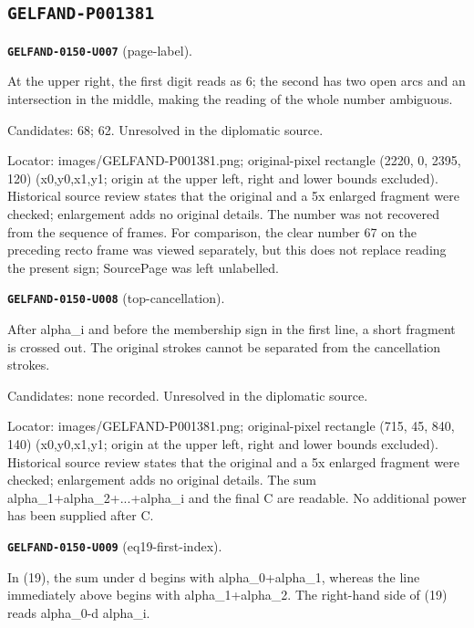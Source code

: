 \documentclass[11pt]{article}
\theoremstyle{definition}
\theoremstyle{remark}
\begin{document}
\subsection*{\texttt{GELFAND-P001381}}
\noindent\leavevmode{}\label{GELFAND-P001381:page-label:note}\textbf{\texttt{GELFAND-0150-U007}} (page-label).\par\nopagebreak[4]
At the upper right, the first digit reads as 6; the second has two open arcs and an intersection in the middle, making the reading of the whole number ambiguous.\par
Candidates: 68; 62. Unresolved in the diplomatic source.\par
Locator: images/GELFAND-P001381.png; original-pixel rectangle (2220, 0, 2395, 120) (x0,y0,x1,y1; origin at the upper left, right and lower bounds excluded). Historical source review states that the original and a 5x enlarged fragment were checked; enlargement adds no original details. The number was not recovered from the sequence of frames. For comparison, the clear number 67 on the preceding recto frame was viewed separately, but this does not replace reading the present sign; SourcePage was left unlabelled.\par\medskip
\noindent\leavevmode{}\label{GELFAND-P001381:top-cancellation:note}\textbf{\texttt{GELFAND-0150-U008}} (top-cancellation).\par\nopagebreak[4]
After alpha\_i and before the membership sign in the first line, a short fragment is crossed out. The original strokes cannot be separated from the cancellation strokes.\par
Candidates: none recorded. Unresolved in the diplomatic source.\par
Locator: images/GELFAND-P001381.png; original-pixel rectangle (715, 45, 840, 140) (x0,y0,x1,y1; origin at the upper left, right and lower bounds excluded). Historical source review states that the original and a 5x enlarged fragment were checked; enlargement adds no original details. The sum alpha\_1+alpha\_2+...+alpha\_i and the final C are readable. No additional power has been supplied after C.\par\medskip
\noindent\leavevmode{}\label{GELFAND-P001381:eq19-first-index:note}\textbf{\texttt{GELFAND-0150-U009}} (eq19-first-index).\par\nopagebreak[4]
In (19), the sum under d begins with alpha\_0+alpha\_1, whereas the line immediately above begins with alpha\_1+alpha\_2. The right-hand side of (19) reads alpha\_0-d alpha\_i.\par
\end{document}

